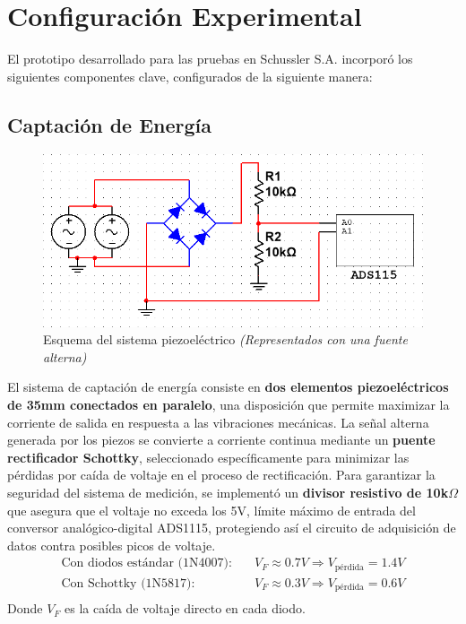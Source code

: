 \documentclass{article}
\begin{document}
\section{Configuración Experimental}
El prototipo desarrollado para las pruebas en Schussler S.A. incorporó los siguientes componentes clave, configurados de la siguiente manera:
\subsection{Captación de Energía}
\begin{figure}[H]
    \centering
    \includegraphics[scale=0.45]{ConversionAC.png}
    \caption{Esquema del sistema piezoeléctrico \textit{(Representados con una fuente alterna)}}
    \label{fig:my_label}
\end{figure}
El sistema de captación de energía consiste en \textbf{dos elementos piezoeléctricos de 35mm conectados en paralelo}, una disposición que permite maximizar la corriente de salida en respuesta a las vibraciones mecánicas. La señal alterna generada por los piezos se convierte a corriente continua mediante un \textbf{puente rectificador Schottky}, seleccionado específicamente para minimizar las pérdidas por caída de voltaje en el proceso de rectificación. Para garantizar la seguridad del sistema de medición, se implementó un \textbf{divisor resistivo de 10k$\Omega$} que asegura que el voltaje no exceda los 5V, límite máximo de entrada del conversor analógico-digital ADS1115, protegiendo así el circuito de adquisición de datos contra posibles picos de voltaje.
\begin{align*}
\text{Con diodos estándar (1N4007):} &\quad V_F \approx 0.7V \Rightarrow V_{\text{pérdida}} = 1.4V \\
\text{Con Schottky (1N5817):} &\quad V_F \approx 0.3V \Rightarrow V_{\text{pérdida}} = 0.6V \\
\end{align*}
Donde $V_F$ es la caída de voltaje directo en cada diodo.\\
\end{document}

